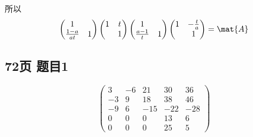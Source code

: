\begin{solution}
\[\]
所以
\[
    \begin{pmatrix} 1 &  \\ \frac{1 - a}{at} & 1 \end{pmatrix} \begin{pmatrix} 1 & t \\  & 1 \end{pmatrix} \begin{pmatrix} 1 &  \\ \frac{a - 1}{t} & 1 \end{pmatrix} \begin{pmatrix} 1 & -\frac{t}{a} \\  & 1 \end{pmatrix} = \mat{A}
\]
\end{solution}

\subsection*{72页 题目1}
\[
\left(\begin{matrix}
    3 & -6 & 21 & 30 & 36 \\
    -3 & 9 & 18 & 38 & 46 \\
    -9 & 6 & -15 & -22 & -28 \\
    0 & 0 & 0 & 13 & 6 \\
    0 & 0 & 0 & 25 & 5
\end{matrix}\right)
\]

